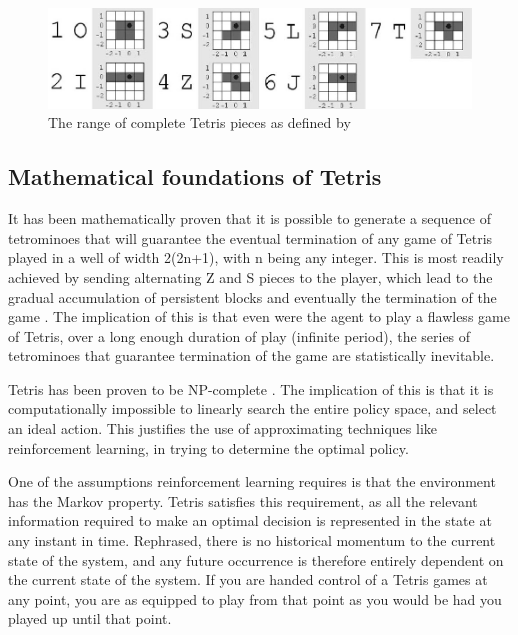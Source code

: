 \documentclass{rucsthesis}
\begin{document}
\begin{figure}[h]
\centering
\includegraphics[width=\textwidth]{tetrisblocks.jpg}
\caption{The range of complete Tetris pieces as defined by \cite{tetstand}}
\label{fig:pieces}
\end{figure}

\subsection{Mathematical foundations of Tetris}

It has been mathematically proven \citep{mathproof,losetetris} that it is possible to generate a sequence of tetrominoes that will guarantee the eventual termination of any game of Tetris played in a well of width 2(2n+1), with n being any integer. This is most readily achieved by sending alternating Z and S pieces to the player, which lead to the gradual accumulation of persistent blocks and eventually the termination of the game \citep[Chpt. 5]{mathproof}. The implication of this is that even were the agent to play a flawless game of Tetris, over a long enough duration of play (infinite period), the series of tetrominoes that guarantee termination of the game are statistically inevitable.

Tetris has been proven to be NP-complete \citep{hardtet}. The implication of this is that it is computationally impossible to linearly search the entire policy space, and select an ideal action. This justifies the use of approximating techniques like reinforcement learning, in trying to determine the optimal policy.

One of the assumptions reinforcement learning requires is that the environment has the Markov property\citep{suttonbarto}. Tetris satisfies this requirement, as all the relevant information required to make an optimal decision is represented in the state at any instant in time. Rephrased, there is no historical momentum to the current state of the system, and any future occurrence is therefore entirely dependent on the current state of the system. If you are handed control of a Tetris games at any point, you are as equipped to play from that point as you would be had you played up until that point.
\end{document}
